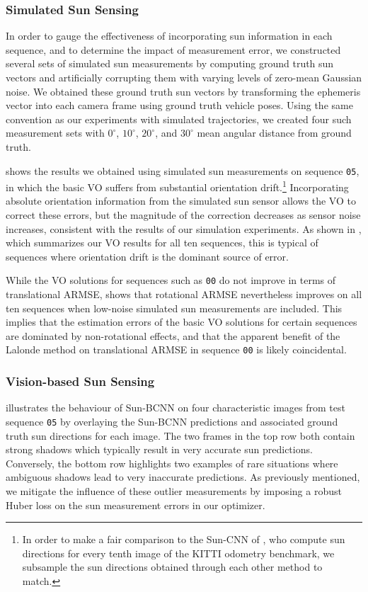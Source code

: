\subsubsection{Simulated Sun Sensing} \label{sec:kitti_vo_sim_sun}
In order to gauge the effectiveness of incorporating sun information in each sequence, and to determine the impact of measurement error, we constructed several sets of simulated sun measurements by computing ground truth sun vectors and artificially corrupting them with varying levels of zero-mean Gaussian noise.
We obtained these ground truth sun vectors by transforming the ephemeris vector into each camera frame using ground truth vehicle poses.
Using the same convention as our experiments with simulated trajectories, we created four such measurement sets with $0^\circ$, $10^\circ$, $20^\circ$, and $30^\circ$ mean angular distance from ground truth.

 shows the results we obtained using simulated sun measurements on sequence \texttt{05}, in which the basic VO suffers from substantial orientation drift.\footnote{In order to make a fair comparison to the Sun-CNN of \citet{Ma2016-at}, who compute sun directions for every tenth image of the KITTI odometry benchmark, we subsample the sun directions obtained through each other method to match.}
Incorporating absolute orientation information from the simulated sun sensor allows the VO to correct these errors, but the magnitude of the correction decreases as sensor noise increases, consistent with the results of our simulation experiments.
As shown in , which summarizes our VO results for all ten sequences, this is typical of sequences where orientation drift is the dominant source of error.

While the VO solutions for sequences such as \texttt{00} do not improve in terms of translational ARMSE,  shows that rotational ARMSE nevertheless improves on all ten sequences when low-noise simulated sun measurements are included.
This implies that the estimation errors of the basic VO solutions for certain sequences are dominated by non-rotational effects, and that the apparent benefit of the Lalonde method on translational ARMSE in sequence \texttt{00} is likely coincidental.

\subsubsection{Vision-based Sun Sensing} \label{sec:kitti_vo_sim_sun}
 illustrates the behaviour of Sun-BCNN on four characteristic images from test sequence \texttt{05} by overlaying the Sun-BCNN predictions and associated ground truth sun directions for each image.
The two frames in the top row both contain strong shadows which typically result in very accurate sun predictions. 
Conversely, the bottom row highlights two examples of rare situations where ambiguous shadows lead to very inaccurate predictions.
As previously mentioned, we mitigate the influence of these outlier measurements by imposing a robust Huber loss on the sun measurement errors in our optimizer.

